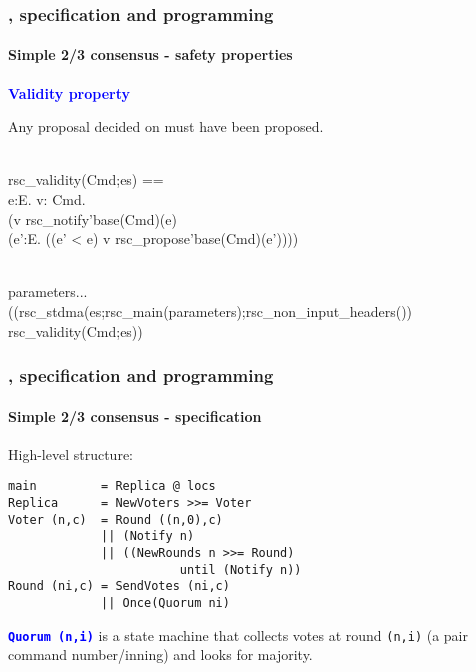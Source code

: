 \documentclass[12pt,red]{beamer}
\newcommand{\cemph}[1]{\textcolor{blue}{\textbf{#1}}}
\renewcommand{\mdownarrow}[1]{}
\begin{document}
\begin{frame}[fragile]
  \frametitle{\eml, specification and programming}

  \framesubtitle{Simple 2/3 consensus - safety properties}

  \cemph{Validity property}

  \vspace{0.1in}

  Any proposal decided on must have been proposed.

  \begin{scriptsize}
    \begin{program*}
      \>\\
      \>rsc\_validity(Cmd;es) ==\\
      \>  \mforall{}e:E. \mforall{}v:\mBbbZ{} \mtimes{} Cmd.\\
      \>    (v \mmember{} rsc\_notify'base(Cmd)(e)\\
      \>    {}\mRightarrow{} (\mdownarrow{}\mexists{}e':E. ((e' < e) \mwedge{} v \mmember{} rsc\_propose'base(Cmd)(e'))))\\
      \>
    \end{program*}
  \end{scriptsize}
  \begin{scriptsize}
    \begin{program*}
      \>\\
      \>\mforall{}parameters...\\
      \>  ((rsc\_stdma(es;rsc\_main(parameters);rsc\_non\_input\_headers())\\
      \>  {}\mRightarrow{} rsc\_validity(Cmd;es))\\
      \>
    \end{program*}
  \end{scriptsize}
\end{frame}


\begin{frame}[fragile]
  \frametitle{\eml, specification and programming}

  \framesubtitle{Simple 2/3 consensus - specification}

  High-level structure:
\begin{lstlisting}
main         = Replica @ locs
Replica      = NewVoters >>= Voter
Voter (n,c)  = Round ((n,0),c)
             || (Notify n)
             || ((NewRounds n >>= Round)
                        until (Notify n))
Round (ni,c) = SendVotes (ni,c)
             || Once(Quorum ni)
\end{lstlisting}

\vspace{0.1in}

\cemph{\lstinline{Quorum (n,i)}} is a state machine that collects
votes at round \lstinline{(n,i)} (a pair command number/inning) and
looks for majority.
\end{frame}
\end{document}
